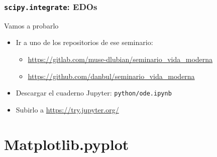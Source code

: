 \documentclass{beamer}
\begin{document}
\begin{frame}\frametitle{\texttt{scipy.integrate}: EDOs}
	\begin{block}{Vamos a probarlo}
		\begin{itemize}
			\item Ir a uno de los repositorios de ese seminario:
			\begin{itemize}
				\item \url{https://gitlab.com/muse-dlubian/seminario_vida_moderna}
				\item \url{https://github.com/danbul/seminario_vida_moderna}
			\end{itemize}
			\item Descargar el cuaderno Jupyter: \texttt{python/ode.ipynb}
			\item Subirlo a \url{https://try.jupyter.org/}
		\end{itemize}
	\end{block}
\end{frame}


\section{Matplotlib.pyplot}
\end{document}
